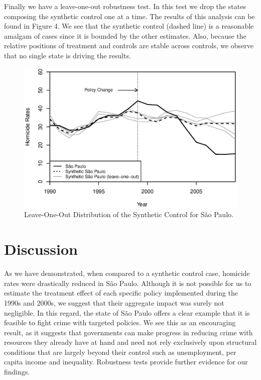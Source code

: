\documentclass[a4paper,11pt]{article}
\begin{document}
Finally we have a leave-one-out robustness test. In this test we drop the states composing the synthetic control one at a time. The results of this analysis can be found in Figure 4. We see that the synthetic control (dashed line) is a reasonable amalgam of cases since it is bounded by the other estimates. Also, because the relative positions of treatment and controls are stable across controls, we observe that no single state is driving the results.

\begin{figure}[htp!]
\begin{center}
\centerline{\includegraphics[width=.6\textwidth]{leave-one-out.eps}}
\caption{Leave-One-Out Distribution of the Synthetic Control for S\~{a}o Paulo.}\label{leave}
\end{center}
\end{figure}

\section{Discussion}

As we have demonstrated, when compared to a synthetic control case, homicide rates were drastically reduced in S\~{a}o Paulo. Although it is not possible for us to estimate the treatment effect of each specific policy implemented during the 1990s and 2000s, we suggest that their aggregate impact was surely not negligible. In this regard, the state of S\~{a}o Paulo offers a clear example that it is feasible to fight crime with targeted policies. We see this as an encouraging result, as it suggests that governments can make progress in reducing crime with resources they already have at hand and need not rely exclusively upon structural conditions that are largely beyond their control such as unemployment, per capita income and inequality. Robustness tests provide further evidence for our findings.
\end{document}
